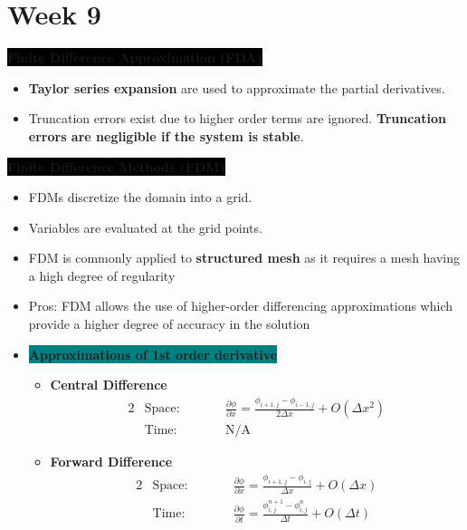 \section{Week 9}
\colorbox{black}{\textbf{\color{white}Finite Difference Approximation (FDA)}}

\begin{itemize}
    \item \textbf{\color{red}Taylor series expansion} are used to approximate the partial derivatives. 
    \item Truncation errors exist due to higher order terms are ignored. \textbf{\color{orange}Truncation errors are negligible if the system is stable}.
\end{itemize}

\colorbox{black}{\textbf{\color{white}Finite Difference Methods (FDM)}}
\begin{itemize}
    \item FDMs discretize the domain into a grid. 
    \item Variables are evaluated at the grid points.
    \item FDM is commonly applied to \textbf{\color{red}structured mesh} as it requires a mesh having a high degree of regularity
    \item Pros: FDM allows the use of higher-order differencing approximations which provide a higher degree of accuracy in the solution
    \item \colorbox{teal}{\textbf{\color{white}Approximations of 1st order derivative}}
    \begin{itemize}
        \item \textbf{\color{red}Central Difference}
        \begin{alignat*}{2}
            &\text{Space:} \qquad && \frac{\partial \phi}{\partial x} = \frac{\phi_{i+1,j}-\phi_{i-1,j}}{2\Delta x} + O(\Delta x^2) \\
            &\text{Time:}\qquad && \text{N/A}
        \end{alignat*}
        \item \textbf{\color{red}Forward Difference}
        \begin{alignat*}{2}
            &\text{Space:}\qquad &&\frac{\partial \phi}{\partial x} = \frac{\phi_{i+1,j}-\phi_{i,j}}{\Delta x} + O(\Delta x)\\
            &\text{Time:}\qquad && \frac{\partial \phi }{\partial t} = \frac{\phi_{i,j}^{n+1}-\phi_{i,j}^{n}}{\Delta t} + O(\Delta t)
        \end{alignat*}

\end{itemize}
\end{itemize}
